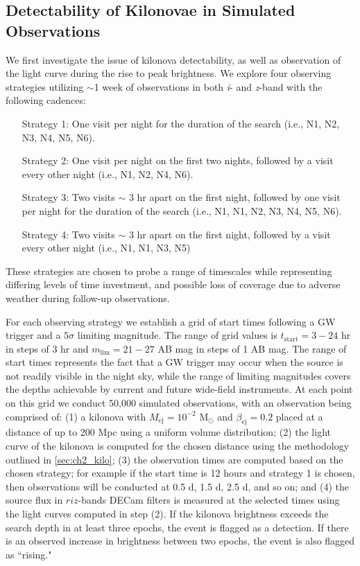 \subsection{Detectability of Kilonovae in Simulated Observations}
\label{sec:ch2_MCsims_det}
We first investigate the issue of kilonova detectability, as well as observation of the light curve during the rise to peak brightness. We explore four observing strategies utilizing $\sim$1 week of observations in both {\em i}- and {\em z}-band with the following cadences:
{\small \begin{enumerate}[leftmargin = 2.5cm]
\item[Strategy 1:] One visit per night for the duration of the search (i.e., N1, N2, N3, N4, N5, N6).
\item[Strategy 2:]  One visit per night on the first two nights, followed by a visit every other night (i.e., N1, N2, N4, N6).
\item[Strategy 3:]  Two visits $\sim$ 3 hr apart on the first night, followed by one visit per night for the duration of the search (i.e., N1, N1, N2, N3, N4, N5, N6).
\item[Strategy 4:]  Two visits $\sim$ 3 hr apart on the first night, followed by a visit every other night (i.e., N1, N1, N3, N5)
\end{enumerate}}
\noindent These strategies are chosen to probe a range of timescales while representing differing levels of time investment, and possible loss of coverage due to adverse weather during follow-up observations.

For each observing strategy we establish a grid of start times following a GW trigger and a $5\sigma$ limiting magnitude. The range of grid values is $t_{\text{start}} = 3-24$ hr in steps of 3 hr and $m_{\text{lim}} = 21-27$ AB mag in steps of 1 AB mag. The range of start times represents the fact that a GW trigger may occur when the source is not readily visible in the night sky, while the range of limiting magnitudes covers the depths achievable by current and future wide-field instruments. At each point on this grid we conduct 50,000 simulated observations, with an observation being comprised of: (1) a kilonova with $M_{\text{ej}} = 10^{-2} \text{ M}_{\odot}$ and $\beta_{\text{ej}} = 0.2$ placed at a distance of up to 200 Mpc using a uniform volume distribution; (2) the light curve of the kilonova is computed for the chosen distance using the methodology outlined in \autoref{sec:ch2_kilo}; (3) the observation times are computed based on the chosen strategy; for example if the start time is 12 hours and strategy 1 is chosen, then observations will be conducted at 0.5 d, 1.5 d, 2.5 d, and so on; and (4) the source flux in $riz$-bands DECam filters is measured at the selected times using the light curves computed in step (2). If the kilonova brightness exceeds the search depth in at least three epochs, the event is flagged as a detection. If there is an observed increase in brightness between two epochs, the event is also flagged as ``rising."


